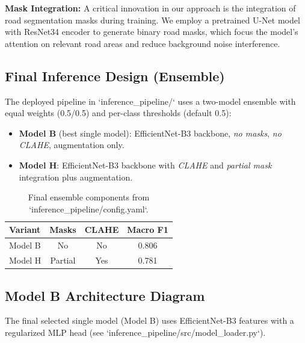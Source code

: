\documentclass[12pt,twocolumn]{article}
\begin{document}
\textbf{Mask Integration:} A critical innovation in our approach is the integration of road segmentation masks during training. We employ a pretrained U-Net model with ResNet34 encoder to generate binary road masks, which focus the model's attention on relevant road areas and reduce background noise interference.

\subsection{Final Inference Design (Ensemble)}

The deployed pipeline in `inference\_pipeline/` uses a two-model ensemble with equal weights (0.5/0.5) and per-class thresholds (default 0.5):
\begin{itemize}
  \item \textbf{Model B} (best single model): EfficientNet-B3 backbone, \emph{no masks}, \emph{no CLAHE}, augmentation only.
  \item \textbf{Model H}: EfficientNet-B3 backbone with \emph{CLAHE} and \emph{partial mask} integration plus augmentation.
\end{itemize}

\begin{table}[h]
  \centering
  \begin{tabular}{lccc}
    \toprule
    \textbf{Variant} & \textbf{Masks} & \textbf{CLAHE} & \textbf{Macro F1} \\
    \midrule
    Model B & No & No & 0.806 \\
    Model H & Partial & Yes & 0.781 \\
    \bottomrule
  \end{tabular}
  \caption{Final ensemble components from `inference\_pipeline/config.yaml`.}
\end{table}

\subsection{Model B Architecture Diagram}

The final selected single model (Model B) uses EfficientNet-B3 features with a regularized MLP head (see `inference\_pipeline/src/model\_loader.py`).
\end{document}
